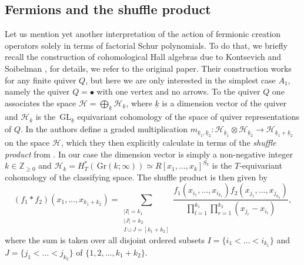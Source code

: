 \documentclass[12pt]{amsart}
\newcommand{\Z}{\mathbb{Z}}
\newcommand{\GL}{\,\mathrm{GL}}
\newcommand{\Gr}{\,\mathrm{Gr}}
\newcommand{\ring}{R}
\numberwithin{equation}{section}
\numberwithin{figure}{section}
\begin{document}
\subsection{Fermions and the shuffle product}\label{sec:shuffle} 
Let us mention yet another interpretation of the action of fermionic creation operators solely in terms of factorial Schur polynomials. To do that, we briefly recall the construction of cohomological Hall algebras due to Kontsevich and Soibelman \cite{kontsevich2011cohomological}, for details, we refer to the original paper. Their construction works for any finite quiver $Q$, but here we are only interested in the simplest case $A_1$, namely the quiver $Q=\bullet$ with one vertex and no arrows. To the quiver $Q$ one associates the space $\mathcal{H} = \bigoplus_{\underline{k}}\mathcal{H}_{\underline{k}}$, where $\underline{k}$ is a dimension vector of the quiver and $\mathcal{H}_{\underline{k}}$ is the $\GL_{\underline{k}}$ equivariant cohomology of the space of quiver representations of $Q$. In \cite{kontsevich2011cohomological} the authors define a graded multiplication $m_{\underline{k}_1, \underline{k}_2}: \mathcal{H}_{\underline{k}_1} \otimes \mathcal{H}_{\underline{k}_2} \to \mathcal{H}_{\underline{k}_1 + \underline{k}_2}$ on the space $\mathcal{H}$, which they then explicitly calculate in terms of the {\em shuffle product} from \cite{feigin1995vector}.  In our case the dimension vector is simply a non-negative integer $k \in\Z_{\ge 0}$ and $\mathcal{H}_{k} = H^*_T(\Gr(k;\infty)) \simeq \ring[x_1, \ldots, x_{k}]^{S_{k}}$ is the $T$-equivariant cohomology of the classifying space. The shuffle product is then given by
\begin{equation}\label{shuffle}
    (f_1 \ast f_2)(x_1, \ldots, x_{k_1 + k_2}) = \sum\limits_{\substack{|I|=k_1 \\ |J| = k_2 \\ I \cup J = [k_1 + k_2]}} \frac{f_1 (x_{i_1}, \ldots , x_{i_{k_1}}) f_2(x_{j_1}, \ldots, x_{j_{k_2}})}{\prod\limits_{l = 1}^{k_1}\prod\limits_{r = 1}^{k_2}(x_{j_r} - x_{i_l})},
\end{equation}
where the sum is taken over all disjoint ordered subsets $I=\{i_1<\ldots<i_{k_1}\}$ and $J=\{j_1<\ldots<j_{k_2}\}$ of $\{1,2,\ldots,k_1+k_2\}$. 
\end{document}
